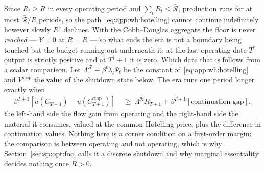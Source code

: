 Since $R_t\ge\bar R$ in every operating period and $\sum_tR_t\le\bar{\mathcal R}$, production runs for at most $\bar{\mathcal R}/\bar R$ periods, so the path~\eqref{eq:app:wh:hotelling} cannot continue indefinitely however slowly $R^e$ declines. With the Cobb--Douglas aggregate the floor is never \emph{reached} --- $Y=0$ at $R=\bar R$ --- so what ends the era is not a boundary being touched but the budget running out underneath it: at the last operating date $T^\dagger$ output is strictly positive and at $T^\dagger+1$ it is zero. Which date that is follows from a scalar comparison. Let $\Lambda^{\mathcal R}\equiv\beta^t\lambda_t\Psi_t$ be the constant of~\eqref{eq:app:wh:hotelling} and $V^{\mathrm{stop}}$ the value of the shutdown state below. The era runs one period longer exactly when
\begin{align}
\beta^{T+1}\left[u\!\left(C_{T+1}\right)-u\!\left(C^{\mathrm{stop}}_{T+1}\right)\right]
&\;\ge\;\Lambda^{\mathcal R}R_{T+1}
+\beta^{T+1}\left[\text{continuation gap}\right],
\label{eq:app:wh:shutdown}
\end{align}
the left-hand side the flow gain from operating and the right-hand side the material it consumes, valued at the common Hotelling price, plus the difference in continuation values. Nothing here is a corner condition on a first-order margin: the comparison is between operating and not operating, which is why Section~\ref{sec:sp:opt:foc} calls it a discrete shutdown and why marginal essentiality decides nothing once $\bar R>0$.

